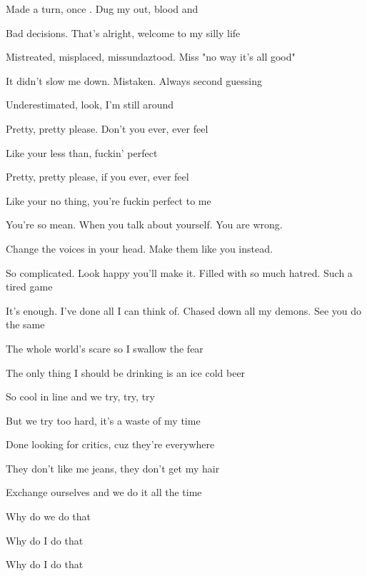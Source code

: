 

\zs
 Made a  turn, once . Dug my  out, blood and 

Bad decisions. That's alright, welcome to my silly life

Mistreated, misplaced, missundaztood. Miss "no way it's all good"

It didn't slow me down. Mistaken. Always second guessing

Underestimated, look, I'm still around
\ks

\zr
Pretty, pretty please. Don't you ever, ever feel

Like your less than, fuckin' perfect

Pretty, pretty please, if you ever, ever feel

Like your no thing, you're fuckin perfect to me
\kr

\zs
You're so mean. When you talk about yourself. You are wrong. 

Change the voices in your head. Make them like you instead.

So complicated. Look happy you'll make it. Filled with so much hatred. Such a tired game

It's enough. I've done all I can think of. Chased down all my demons. See you do the same
\ks

\zr
\kr

\zs
The whole world's scare so I swallow the fear

The only thing I should be drinking is an ice cold beer

So cool in line and we try, try, try

But we try too hard, it's a waste of my time

Done looking for critics, cuz they're everywhere

They don't like me jeans, they don't get my hair

Exchange ourselves and we do it all the time

Why do we do that

Why do I do that

Why do I do that
\ks

\zr \kr

\kp